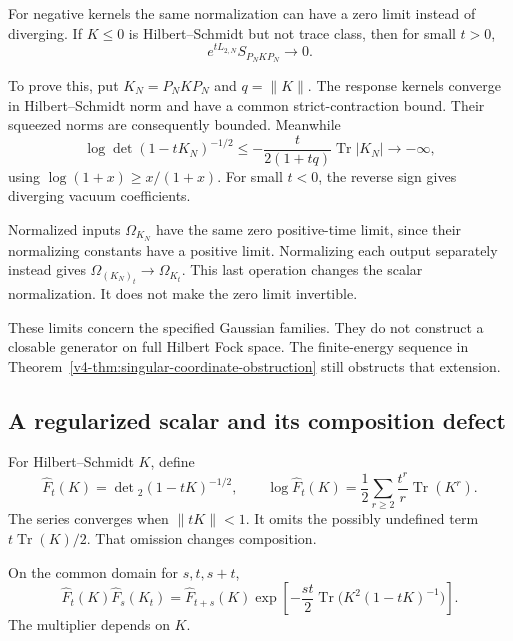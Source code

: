 For negative kernels the same normalization
can have a zero limit instead of diverging.
If \(K\leq0\) is Hilbert--Schmidt but not
trace class, then for small \(t>0\),
\[
                         e^{tL_{2,N}}S_{P_NKP_N}\longrightarrow0.
\]

To prove this, put \(K_N=P_NKP_N\) and
\(q=\|K\|\). The response kernels converge
in Hilbert--Schmidt norm and have a common
strict-contraction bound. Their squeezed norms
are consequently bounded. Meanwhile
\[
 \log\det(1-tK_N)^{-1/2}
       \leq-\frac{t}{2(1+tq)}\operatorname{Tr}|K_N|
                                                \longrightarrow-\infty,
\]
using \(\log(1+x)\geq x/(1+x)\).
For small \(t<0\), the reverse sign gives
diverging vacuum coefficients.

Normalized inputs \(\Omega_{K_N}\) have the
same zero positive-time limit, since their
normalizing constants have a positive limit.
Normalizing each output separately instead
gives \(\Omega_{(K_N)_t}\to\Omega_{K_t}\).
This last operation changes the scalar
normalization. It does not make the
zero limit invertible.

These limits concern the specified Gaussian
families. They do not construct a closable
generator on full Hilbert Fock space.
The finite-energy sequence in
Theorem~\ref{v4-thm:singular-coordinate-obstruction}
still obstructs that extension.

\subsection{A regularized scalar and its composition defect}

For Hilbert--Schmidt \(K\), define
\[
 \widehat F_t(K)=\det{}_2(1-tK)^{-1/2},
 \qquad
 \log\widehat F_t(K)
       =\frac12\sum_{r\geq2}\frac{t^r}{r}\operatorname{Tr}(K^r).
\]
The series converges when \(\|tK\|<1\).
It omits the possibly undefined term
\(t\operatorname{Tr}(K)/2\).
That omission changes composition.

\begin{proposition}\label{v4-prop:singular-determinant-defect}
On the common domain for \(s,t,s+t\),
\begin{equation}\label{v4-eq:singular-determinant-defect}
 \widehat F_t(K)\widehat F_s(K_t)
  =\widehat F_{t+s}(K)
     \exp\left[-\frac{st}{2}
                 \operatorname{Tr}\bigl(K^2(1-tK)^{-1}\bigr)\right].
\end{equation}
The multiplier depends on \(K\).
\end{proposition}

